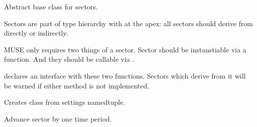 \documentclass[letterpaper,10pt,english]{sphinxmanual}
\begin{document}
\begin{fulllineitems}
\label{\detokenize{api:muse.sectors.AbstractSector}}
Abstract base class for sectors.

Sectors are part of type hierarchy with  at the apex: all
sectors should derive from  directly or indirectly.

MUSE only requires two things of a sector. Sector should be instanstiable via a
 function. And they should be callable via
.

 declares an interface with these two functions. Sectors
which derive from it will be warned if either method is not implemented.

\begin{fulllineitems}
\label{\detokenize{api:muse.sectors.AbstractSector.factory}}
Creates class from settings named\sphinxhyphen{}tuple.

\end{fulllineitems}


\begin{fulllineitems}
\label{\detokenize{api:muse.sectors.AbstractSector.next}}
Advance sector by one time period.

\end{fulllineitems}


\end{fulllineitems}
\end{document}
